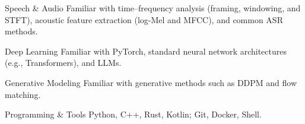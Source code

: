 
\VectraSkillGroup
    {Speech \& Audio}
    {Familiar with time--frequency analysis (framing, windowing, and STFT), acoustic feature extraction (log-Mel and MFCC), and common ASR methods.}

\VectraSkillGroup
    {Deep Learning}
    {Familiar with PyTorch, standard neural network architectures (e.g., Transformers), and LLMs.}

\VectraSkillGroup
    {Generative Modeling}
    {Familiar with generative methods such as DDPM and flow matching.}

\VectraSkillGroup
    {Programming \& Tools}
    {Python, C++, Rust, Kotlin; Git, Docker, Shell.}
